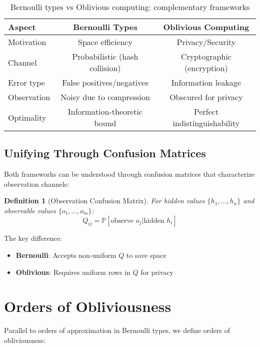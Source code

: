 \documentclass[11pt,final]{article}
\newtheorem{definition}[theorem]{Definition}
\newcommand{\Prob}[1]{\mathbb{P}\left[#1\right]}
\begin{document}
\begin{table}[h]
\centering
\begin{tabular}{|l|c|c|}
\hline
\textbf{Aspect} & \textbf{Bernoulli Types} & \textbf{Oblivious Computing} \\
\hline
Motivation & Space efficiency & Privacy/Security \\
Channel & Probabilistic (hash collision) & Cryptographic (encryption) \\
Error type & False positives/negatives & Information leakage \\
Observation & Noisy due to compression & Obscured for privacy \\
Optimality & Information-theoretic bound & Perfect indistinguishability \\
\hline
\end{tabular}
\caption{Bernoulli types vs Oblivious computing: complementary frameworks}
\end{table}

\subsection{Unifying Through Confusion Matrices}

Both frameworks can be understood through confusion matrices that characterize observation channels:

\begin{definition}[Observation Confusion Matrix]
For hidden values $\{h_1, ..., h_n\}$ and observable values $\{o_1, ..., o_m\}$:
\begin{equation}
Q_{ij} = \Prob{\text{observe } o_j | \text{hidden } h_i}
\end{equation}
\end{definition}

The key difference:
\begin{itemize}
\item \textbf{Bernoulli}: Accepts non-uniform $Q$ to save space
\item \textbf{Oblivious}: Requires uniform rows in $Q$ for privacy
\end{itemize}

\section{Orders of Obliviousness}

Parallel to orders of approximation in Bernoulli types, we define orders of obliviousness:
\end{document}
